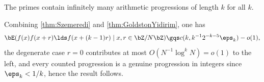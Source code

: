 \documentclass[article, a4paper, twoside]{universal}
\begin{document}

\begin{thm}
    The primes contain infinitely many arithmetic progressions of length $k$ for all $k$.
\end{thm}

\begin{prf}
    Combining \cref{thm:Szemeredi} and \cref{thm:GoldstonYidirim}, one has
    \[
        \bE(f(x)f(x+r)\lds f(x+(k-1)r)\mid x,r\in\bZ/N\bZ)\gqs c(k,k^{-1}2^{-k-5}\eps_{k})-o(1),
    \]
    the degenerate case $r=0$ contributes at most $O(N^{-1}\log^{k}N)=o(1)$ to the left, and every counted progression is a genuine progression in integers since $\eps_{k}<1/k$, hence the result follows.
\end{prf}


\printref
\end{document}
